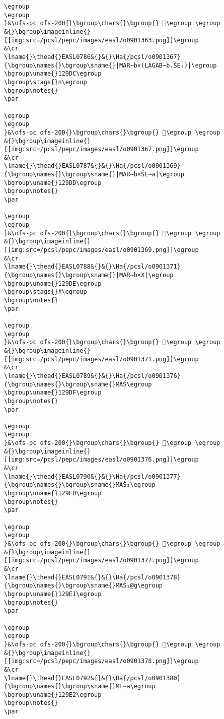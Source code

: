 \begin{verbatim}
\egroup
\egroup
}&\ofs-pc ofs-200{}\bgroup\chars{}\bgroup{} 𒧛\egroup \egroup
&{}\bgroup\imageinline{}[[img:src=/pcsl/pepc/images/easl/o0901363.png]]\egroup
&\cr
\lname{}\thead{}EASL0786&{}&{}\Ha{/pcsl/o0901367}{\bgroup\names{}\bgroup\sname{}|MAR∼b×(LAGAB∼b.ŠE₃)|\egroup
\bgroup\uname{}129DC\egroup
\bgroup\stags{}n\egroup
\bgroup\notes{}
\par 

\egroup
\egroup
}&\ofs-pc ofs-200{}\bgroup\chars{}\bgroup{} 𒧜\egroup \egroup
&{}\bgroup\imageinline{}[[img:src=/pcsl/pepc/images/easl/o0901367.png]]\egroup
&\cr
\lname{}\thead{}EASL0787&{}&{}\Ha{/pcsl/o0901369}{\bgroup\names{}\bgroup\sname{}|MAR∼b×ŠE∼a|\egroup
\bgroup\uname{}129DD\egroup
\bgroup\notes{}
\par 

\egroup
\egroup
}&\ofs-pc ofs-200{}\bgroup\chars{}\bgroup{} 𒧝\egroup \egroup
&{}\bgroup\imageinline{}[[img:src=/pcsl/pepc/images/easl/o0901369.png]]\egroup
&\cr
\lname{}\thead{}EASL0788&{}&{}\Ha{/pcsl/o0901371}{\bgroup\names{}\bgroup\sname{}|MAR∼b×X|\egroup
\bgroup\uname{}129DE\egroup
\bgroup\stags{}#\egroup
\bgroup\notes{}
\par 

\egroup
\egroup
}&\ofs-pc ofs-200{}\bgroup\chars{}\bgroup{} 𒧞\egroup \egroup
&{}\bgroup\imageinline{}[[img:src=/pcsl/pepc/images/easl/o0901371.png]]\egroup
&\cr
\lname{}\thead{}EASL0789&{}&{}\Ha{/pcsl/o0901376}{\bgroup\names{}\bgroup\sname{}MAŠ\egroup
\bgroup\uname{}129DF\egroup
\bgroup\notes{}
\par 

\egroup
\egroup
}&\ofs-pc ofs-200{}\bgroup\chars{}\bgroup{} 𒧟\egroup \egroup
&{}\bgroup\imageinline{}[[img:src=/pcsl/pepc/images/easl/o0901376.png]]\egroup
&\cr
\lname{}\thead{}EASL0790&{}&{}\Ha{/pcsl/o0901377}{\bgroup\names{}\bgroup\sname{}MAŠ₂\egroup
\bgroup\uname{}129E0\egroup
\bgroup\notes{}
\par 

\egroup
\egroup
}&\ofs-pc ofs-200{}\bgroup\chars{}\bgroup{} 𒧠\egroup \egroup
&{}\bgroup\imageinline{}[[img:src=/pcsl/pepc/images/easl/o0901377.png]]\egroup
&\cr
\lname{}\thead{}EASL0791&{}&{}\Ha{/pcsl/o0901378}{\bgroup\names{}\bgroup\sname{}MAŠ₂@g\egroup
\bgroup\uname{}129E1\egroup
\bgroup\notes{}
\par 

\egroup
\egroup
}&\ofs-pc ofs-200{}\bgroup\chars{}\bgroup{} 𒧡\egroup \egroup
&{}\bgroup\imageinline{}[[img:src=/pcsl/pepc/images/easl/o0901378.png]]\egroup
&\cr
\lname{}\thead{}EASL0792&{}&{}\Ha{/pcsl/o0901380}{\bgroup\names{}\bgroup\sname{}ME∼a\egroup
\bgroup\uname{}129E2\egroup
\bgroup\notes{}
\par 


\end{verbatim}
